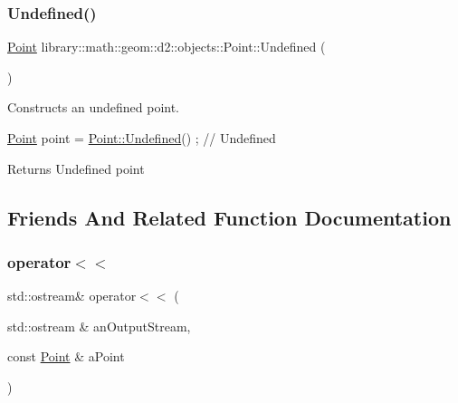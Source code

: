 \subsubsection{\texorpdfstring{Undefined()}{Undefined()}}
{\footnotesize\ttfamily \hyperlink{classlibrary_1_1math_1_1geom_1_1d2_1_1objects_1_1_point}{Point} library\+::math\+::geom\+::d2\+::objects\+::\+Point\+::\+Undefined (\begin{DoxyParamCaption}{ }\end{DoxyParamCaption})\hspace{0.3cm}{\ttfamily [static]}}



Constructs an undefined point. 


\begin{DoxyCode}
\hyperlink{classlibrary_1_1math_1_1geom_1_1d2_1_1objects_1_1_point_a4998aefdf80bdfd967f21d49fa050398}{Point} point = \hyperlink{classlibrary_1_1math_1_1geom_1_1d2_1_1objects_1_1_point_a110a5bba9399abc5408f6c34306040c6}{Point::Undefined}() ; \textcolor{comment}{// Undefined}
\end{DoxyCode}


\begin{DoxyReturn}{Returns}
Undefined point 
\end{DoxyReturn}


\subsection{Friends And Related Function Documentation}
\mbox{\label{classlibrary_1_1math_1_1geom_1_1d2_1_1objects_1_1_point_ac6c8450721254f3cefdea7dcdd5f5001}} 
\subsubsection{\texorpdfstring{operator$<$$<$}{operator<<}}
{\footnotesize\ttfamily std\+::ostream\& operator$<$$<$ (\begin{DoxyParamCaption}\item[{std\+::ostream \&}]{an\+Output\+Stream,  }\item[{const \hyperlink{classlibrary_1_1math_1_1geom_1_1d2_1_1objects_1_1_point}{Point} \&}]{a\+Point }\end{DoxyParamCaption})\hspace{0.3cm}{\ttfamily [friend]}}



